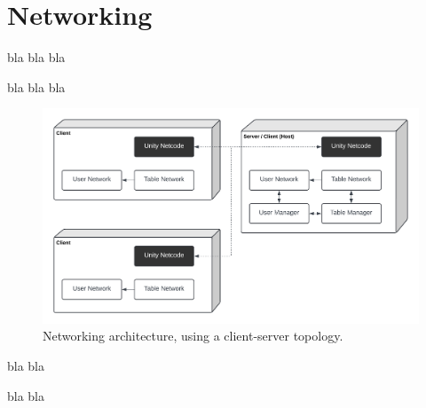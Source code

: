     
\section{Networking}

bla bla bla

bla bla bla


    \begin{figure}[h]
        \centering
        \includegraphics[width=1\linewidth]{figures/topology.png}
        \caption{Networking architecture, using a client-server topology.}
        \label{fig:topology}
    \end{figure}

    bla bla

    bla bla

    

